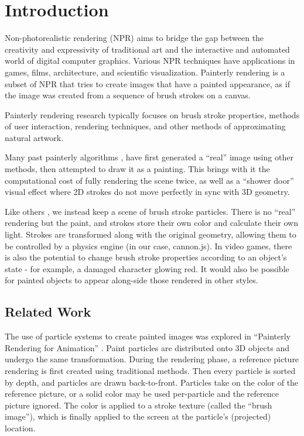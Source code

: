 \documentclass[conference]{acmsiggraph}
\begin{document}
\section{Introduction}

Non-photorealistic rendering (NPR) aims to bridge the gap between the
creativity and expressivity of traditional art and the interactive and
automated world of digital computer graphics. Various NPR techniques have
applications in games, films, architecture, and scientific visualization.
Painterly rendering is a subset of NPR that tries to create images that have a
painted appearance, as if the image was created from a sequence of brush
strokes on a canvas.

Painterly rendering research typically focuses on brush stroke properties,
methods of user interaction, rendering techniques, and other methods of
approximating natural artwork.

Many past painterly algorithms \cite{Hertzmann:1998:PRC:280814.280951},
\cite{Lu:2010:IPS:1730804.1730825} have first generated a ``real'' image using
other methods, then attempted to draw it as a painting. This brings with it the
computational cost of fully rendering the scene twice, as well as a
``shower door'' visual effect where 2D strokes do not move perfectly in sync
with 3D geometry.

Like others \cite{Meier:1996:PRA:237170.237288}, we instead keep a scene of
brush stroke particles. There is no ``real'' rendering but the paint, and
strokes store their own color and calculate their own light. Strokes are
transformed along with the original geometry, allowing them to be controlled by
a physics engine (in our case, cannon.js). In video games, there is also the
potential to change brush stroke properties according to an object's state -
for example, a damaged character glowing red. It would also be possible for
painted objects to appear along-side those rendered in other styles.


\subsection{Related Work}

The use of particle systems to create painted images was explored in
``Painterly Rendering for Animation'' \cite{Meier:1996:PRA:237170.237288}.
Paint particles are distributed onto 3D objects and undergo the same
transformation. During the rendering phase, a reference picture rendering is
first created using traditional methods. Then every particle is sorted by
depth, and particles are drawn back-to-front. Particles take on the color of
the reference picture, or a solid color may be used per-particle and the
reference picture ignored. The color is applied to a stroke texture (called
the ``brush image''), which is finally applied to the screen at the particle's
(projected) location.
\end{document}
